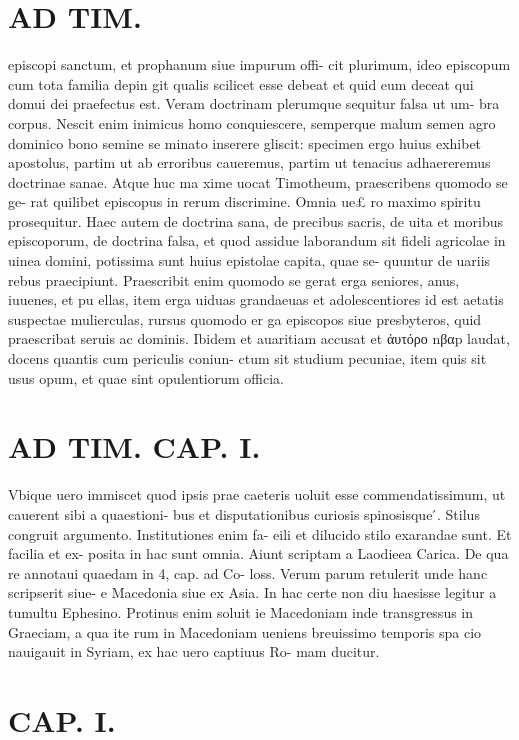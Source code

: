 \documentclass{article}
\begin{document}
\begin{pages}
\section*{AD TIM. }
\marginpar{[ p.93 ]}\pstart episcopi sanctum, et prophanum siue impurum offi- cit plurimum, ideo episcopum cum tota familia depin git qualis scilicet esse debeat et quid eum deceat qui domui dei praefectus est.  \pend\pstart Veram doctrinam plerumque sequitur falsa ut um- bra corpus. Nescit enim inimicus homo conquiescere, semperque malum semen agro dominico bono semine se minato inserere gliscit: specimen ergo huius exhibet apostolus, partim ut ab erroribus caueremus, partim ut tenacius adhaereremus doctrinae sanae. Atque huc ma xime uocat Timotheum, praescribens quomodo se ge- rat quilibet episcopus in rerum discrimine. Omnia ue£ ro maximo spiritu prosequitur.  \pend\pstart Haec autem de doctrina sana, de precibus sacris, de uita et moribus episcoporum, de doctrina falsa, et quod assidue laborandum sit fideli agricolae in uinea domini, potissima sunt huius epistolae capita, quae se- quuntur de uariis rebus praecipiunt. Praescribit enim quomodo se gerat erga seniores, anus, iuuenes, et pu ellas, item erga uiduas grandaeuas et adolescentiores id est aetatis suspectae mulierculas, rursus quomodo er ga episcopos siue presbyteros, quid praescribat seruis ac dominis. Ibidem et auaritiam accusat et ἀυτόρο nβαp laudat, docens quantis cum periculis coniun- ctum sit studium pecuniae, item quis sit usus opum, et quae sint opulentiorum officia.  \pend
\section*{AD TIM. CAP. I. }
\marginpar{[ p.94 ]}\pstart Vbique uero immiscet quod ipsis prae caeteris uoluit esse commendatissimum, ut cauerent sibi a quaestioni- bus et disputationibus curiosis spinosisque ́.  \pend\pstart Stilus congruit argumento. Institutiones enim fa- eili et dilucido stilo exarandae sunt. Et facilia et ex- posita in hac sunt omnia. Aiunt scriptam a Laodieea Carica. De qua re annotaui quaedam in 4, cap. ad Co- loss. Verum parum retulerit unde hanc scripserit siue- e Macedonia siue ex Asia. In hac certe non diu haesisse legitur a tumultu Ephesino. Protinus enim soluit ie Macedoniam inde transgressus in Graeciam, a qua ite rum in Macedoniam ueniens breuissimo temporis spa cio nauigauit in Syriam, ex hac uero captiuus Ro- mam ducitur.  \pend
\endnumbering\beginnumbering\section{CAP. I.}
{}

\end{pages}
\end{document}
